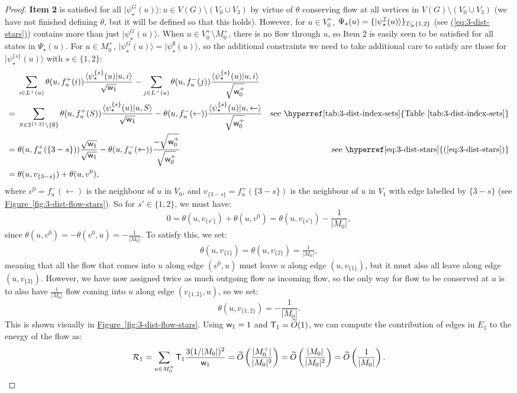 \documentclass{theoretics}
\newcommand{\eq}[1]{\hyperref[eq:#1]{(\ref*{eq:#1})}}
\newcommand{\tabl}[1]{\hyperref[tab:#1]{Table~\ref*{tab:#1}}}
\newcommand{\fig}[1]{\hyperref[fig:#1]{Figure~\ref*{fig:#1}}}
\def\ket#1{{\lvert}#1\rangle}
\renewcommand{\>}{\rangle}
\newcommand{\<}{\langle}
\renewcommand{\(}{\left(}
\renewcommand{\)}{\right)}
\def\braket#1#2{{{\langle}#1\vert}#2\rangle}
\def\w{{\sf w}}
\begin{document}
\begin{proof}
\textbf{Item 2} is satisfied for all $\ket{\psi_\star^G(u)}:u\in V(G)\setminus (V_0\cup V_3)$ by virtue of $\theta$ conserving flow at all vertices in $V(G)\setminus (V_0\cup V_3)$ (we have not finished defining $\theta$, but it will be defined so that this holds). However, for $u\in V_0^+$, $\Psi_\star(u)=\{\ket{\psi_\star^{{\cal I}}(u)}\}_{{\cal I}\subsetneq\{1,2\}}$ (see \eq{3-dist-stars}) contains more than just $\ket{\psi_\star^G(u)}$. When $u\in V_0^+\setminus M_0^+$, there is no flow through $u$, so Item 2 is easily seen to be satisfied for all states in $\Psi_\star(u)$. For $u\in M_0^+$, $\ket{\psi_\star^G(u)}=\ket{\psi_\star^{\emptyset}(u)}$, so the additional constraints we need to take additional care to satisfy are those for $\ket{\psi_\star^{\{s\}}(u)}$ with $s\in \{1,2\}$:
\begin{align*}
&\sum_{i\in L^+(u)}\theta(u,f^+_{u}(i))\frac{\braket{\psi_\star^{\{s\}}(u)}{u,i}}{\sqrt{\w_1}}-\sum_{j\in L^-(u)}\theta(u,f^-_{u}(j))\frac{\braket{\psi_\star^{\{s\}}(u)}{u,i}}{\sqrt{\w_0^+}}\\
={}& \sum_{S \in 2^{\{1,2\}} \setminus \{\emptyset\}}\theta(u,f^+_{u}(S))\frac{\braket{\psi_\star^{\{s\}}(u)}{u,S}}{\sqrt{\w_1}}-\theta(u,f^-_{u}(\leftarrow))\frac{\braket{\psi_\star^{\{s\}}(u)}{u,\leftarrow}}{\sqrt{\w_0^+}} & \mbox{see \tabl{3-dist-index-sets}}\\
={}&\theta(u,f^+_{u}(\{3-s\}))\frac{\sqrt{\w_1}}{\sqrt{\w_1}}-\theta(u,f^-_u(\leftarrow))\frac{-\sqrt{\w_0^+}}{\sqrt{\w_0^+}} & \mbox{see \eq{3-dist-stars}}\\
={}&\theta(u,v_{\{3-s\}})+\theta(u,v^0),
\end{align*}
where $v^0 = f^-_u(\leftarrow)$ is the neighbour of $u$ in $V_0$, and $v_{\{3-s\}} = f^+_u(\{3-s\})$ is the neighbour of $u$ in $V_1$ with edge labelled by $\{3-s\}$ (see \fig{3-dist-flow-stars}). So for $s'\in\{1,2\}$, we must have:
$$0=\theta(u,v_{\{s'\}}) + \theta(u,v^0) = \theta(u,v_{\{s'\}}) - \frac{1}{|M_0|},$$
since $\theta(u,v^0) = -\theta(v^0,u) = -\frac{1}{|M_0|}$. To satisfy this, we set:
\begin{align*}
\theta(u,v_{\{1\}}) = \theta(u,v_{\{2\}}) = \frac{1}{|M_0|},
\end{align*}
meaning that all the flow that comes into $u$ along edge $(v^0,u)$ must leave $u$ along edge $(u,v_{\{1\}})$, but it must also all leave along edge $(u,v_{\{2\}})$. However, we have now assigned twice as much outgoing flow as incoming flow, so the only way for flow to be conserved at $u$ is to also have $\frac{1}{|M_0|}$ flow coming into $u$ along edge $(v_{\{1,2\}},u)$, so we set:
$$\theta(u,v_{\{1,2\}}) = -\frac{1}{|M_0|}.$$
This is shown visually in \fig{3-dist-flow-stars}.
Using $\w_1=1$ and ${\sf T}_1=\widetilde{O}(1)$, we can compute the contribution of edges in $E_1$ to the energy of the flow as:
\begin{equation}
{\cal R}_1 = \sum_{u\in M_0^+}{\sf T}_1\frac{3(1/|M_0|)^2}{\w_1} = \widetilde{O}\left(\frac{|M_0^+|}{|M_0|^2}\right)=\widetilde{O}\left(\frac{|M_0|}{|M_0|^2}\right)=\widetilde{O}\left(\frac{1}{|M_0|}\right).
\label{eq:R2}
\end{equation}


\end{proof}
\end{document}
